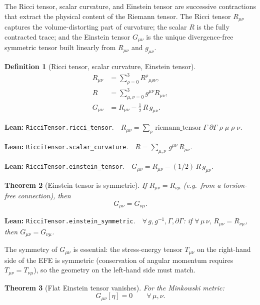 \documentclass[11pt,a4paper]{article}
\newtheorem{theorem}{Theorem}[section]
\newtheorem{definition}[theorem]{Definition}
\newcommand{\lean}[1]{\texttt{#1}}
\newcommand{\leanref}[2]{\noindent\textbf{Lean:} \lean{#1}.\ \ \textit{#2}}
\begin{document}
The Ricci tensor, scalar curvature, and Einstein tensor are successive contractions that extract the physical content of the Riemann tensor.
The Ricci tensor $R_{\mu\nu}$ captures the volume-distorting part of curvature; the scalar $R$ is the fully contracted trace; and the Einstein tensor $G_{\mu\nu}$ is the unique divergence-free symmetric tensor built linearly from $R_{\mu\nu}$ and $g_{\mu\nu}$.

\begin{definition}[Ricci tensor, scalar curvature, Einstein tensor]
\label{def:ricci_einstein}
\begin{align}
R_{\mu\nu} &= \sum_{\rho=0}^{3} R^\rho{}_{\mu\rho\nu}, \label{eq:ricci} \\
R &= \sum_{\mu,\nu=0}^{3} g^{\mu\nu} R_{\mu\nu}, \label{eq:scalar} \\
G_{\mu\nu} &= R_{\mu\nu} - \tfrac{1}{2}\,R\,g_{\mu\nu}. \label{eq:einstein}
\end{align}
\end{definition}

\leanref{RicciTensor.ricci\_tensor}{$R_{\mu\nu} = \sum_\rho\,\mathrm{riemann\_tensor}\;\Gamma\;\partial\Gamma\;\rho\;\mu\;\rho\;\nu$.}

\leanref{RicciTensor.scalar\_curvature}{$R = \sum_{\mu,\nu}\,g^{\mu\nu}\,R_{\mu\nu}$.}

\leanref{RicciTensor.einstein\_tensor}{$G_{\mu\nu} = R_{\mu\nu} - (1/2)\,R\,g_{\mu\nu}$.}

\begin{theorem}[Einstein tensor is symmetric]
\label{thm:einstein_sym}
If $R_{\mu\nu} = R_{\nu\mu}$ (e.g.\ from a torsion-free connection), then
\begin{equation}\label{eq:einstein_sym}
G_{\mu\nu} = G_{\nu\mu}.
\end{equation}
\end{theorem}

\leanref{RicciTensor.einstein\_symmetric}{$\forall\,g,g^{-1},\Gamma,\partial\Gamma$: if $\forall\,\mu\,\nu,\, R_{\mu\nu} = R_{\nu\mu}$, then $G_{\mu\nu} = G_{\nu\mu}$.}

\noindent The symmetry of $G_{\mu\nu}$ is essential: the stress-energy tensor $T_{\mu\nu}$ on the right-hand side of the EFE is symmetric (conservation of angular momentum requires $T_{\mu\nu} = T_{\nu\mu}$), so the geometry on the left-hand side must match.

\begin{theorem}[Flat Einstein tensor vanishes]
\label{thm:einstein_flat}
For the Minkowski metric:
\begin{equation}\label{eq:einstein_flat}
G_{\mu\nu}[\eta] = 0 \qquad \forall\,\mu,\nu.
\end{equation}
\end{theorem}
\end{document}
